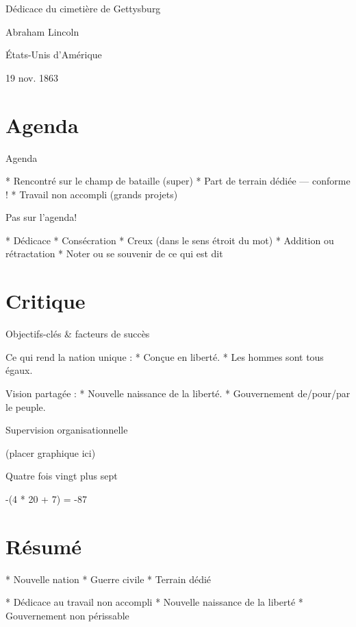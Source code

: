 \documentclass{beamer}
\begin{document}
Dédicace du cimetière de Gettysburg

Abraham Lincoln

États-Unis d'Amérique

19 nov. 1863

\section{Agenda}

Agenda

  * Rencontré sur le champ de bataille (super)
  * Part de terrain dédiée --- conforme !
  * Travail non accompli (grands projets)

Pas sur l'agenda!

  * Dédicace
  * Consécration
  * Creux (dans le sens étroit du mot)
  * Addition ou rétractation
  * Noter ou se souvenir de ce qui est dit

\section{Critique}

Objectifs-clés \& facteurs de succès

Ce qui rend la nation unique :
  * Conçue en liberté.
  * Les hommes sont tous égaux.

Vision partagée :
  * Nouvelle naissance de la liberté.
  * Gouvernement de/pour/par le peuple.

Supervision organisationnelle

(placer graphique ici)

Quatre fois vingt plus sept

-(4 * 20 + 7) = -87

\section{Résumé}

* Nouvelle nation
* Guerre civile
* Terrain dédié

* Dédicace au travail non accompli
* Nouvelle naissance de la liberté
* Gouvernement non périssable
\end{document}
